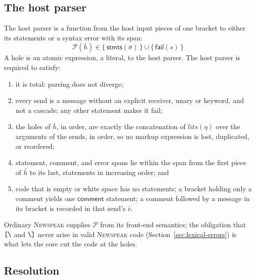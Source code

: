 \documentclass[11pt]{article}
\numberwithin{equation}{section}
\newcommand{\NS}{\textsc{Newspeak}}
\newcommand{\kw}[1]{\ensuremath{\mathsf{#1}}}
\newcommand{\str}[1]{\ensuremath{\text{\texttt{#1}}}}
\newcommand{\bs}{\textbackslash}
\newcommand{\Open}{\str{[\bs}}
\newcommand{\Close}{\str{\bs]}}
\begin{document}
\subsection{The host parser}
\label{sec:host-parser}

The host parser is a function from the host input pieces of one bracket to
either its statements or a syntax error with its span:
\begin{equation}\label{eq:host-parser}
\mathcal{P}(\bar h) \in \{\, \kw{stmts}(\bar\sigma) \,\} \cup
  \{\, \kw{fail}(s) \,\}
\end{equation}
A hole is an atomic expression, a literal, to the host parser.  The host
parser is required to satisfy:
\begin{enumerate}
\item[(H1)] it is total: parsing does not diverge;
\item[(H2)] every send is a message without an explicit receiver, unary or
      keyword, and not a cascade; any other statement makes it fail;
\item[(H3)] the holes of $\bar h$, in order, are exactly the concatenation
      of $\mathit{lits}(\eta)$ over the arguments of the sends, in order, so
      no markup expression is lost, duplicated, or reordered;
\item[(H4)] statement, comment, and error spans lie within the span from
      the first piece of $\bar h$ to its last, statements in increasing
      order; and
\item[(H5)] code that is empty or white space has no statements; a
      bracket holding only a comment yields one $\kw{comment}$ statement;
      a comment followed by a message in its bracket is recorded in that
      send's $\bar c$.
\end{enumerate}
Ordinary \NS{} supplies $\mathcal{P}$ from its front-end semantics; the
obligation that $\Open$ and $\Close$ never arise in valid \NS{} code
(Section~\ref{sec:lexical-errors}) is what lets the core cut the code at
the holes.

\subsection{Resolution}
\end{document}
